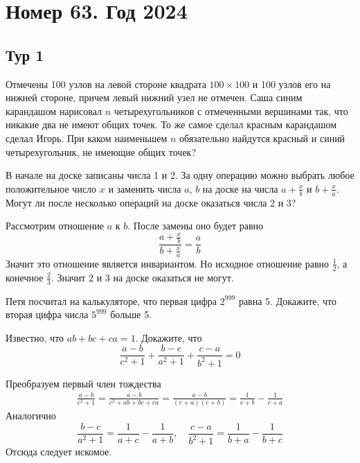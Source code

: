 \documentclass[11pt, a4paper]{problems_template}
\begin{document}
\chapter{Номер 63. Год 2024}

\section{Тур 1}

\begin{exercise}
Отмечены 100 узлов на левой стороне квадрата $100 \times 100$ и 100 узлов его на нижней стороне, причем левый нижний узел не отмечен. Саша синим карандашом нарисовал $n$ четырехугольников с отмеченными вершинами так, что никакие два не имеют общих точек. То же самое сделал красным карандашом сделал Игорь. При каком наименьшем $n$ обязательно найдутся красный и синий четырехугольник, не имеющие общих точек?
\end{exercise}

\begin{exercise}
В начале на доске записаны числа 1 и 2. За одну операцию можно выбрать любое положительное число $x$ и заменить числа $a$, $b$ на доске на числа $a + \frac{x}{b}$ и $b + \frac{x}{a}$. Могут ли
после несколько операций на доске оказаться числа 2 и 3?
\end{exercise}

\begin{Solution}
Рассмотрим отношение $a$ к $b$. После замены оно будет равно
$$
\frac{a + \frac{x}{b}}{b + \frac{x}{a}} = \frac{a}{b}
$$
Значит это отношение является инвариантом. Но исходное отношение равно $\frac{1}{2}$, а конечное $\frac{2}{3}$. Значит 2 и 3 на доске оказаться не могут.
\end{Solution}

\begin{exercise}
Петя посчитал на калькуляторе, что первая цифра $2^{999}$ равна 5. Докажите, что вторая цифра числа $5^{999}$ больше 5.
\end{exercise}

\begin{exercise}
Известно, что $ab + bc + ca = 1$. Докажите, что
$$
\frac{a - b}{c^{2} + 1} + \frac{b - c}{a^{2} + 1} + \frac{c - a}{b^{2} + 1} = 0
$$
\end{exercise}

\begin{Solution}
Преобразуем первый член тождества
\begin{align*}
\frac{a - b}{c^{2} + 1} = \frac{a - b}{c^{2} + ab + bc + ca} = \frac{a - b}{(c + a)(c + b)} = \frac{1}{c + b} - \frac{1}{c + a}
\end{align*}
Аналогично
$$
\frac{b - c}{a^2 + 1} = \frac{1}{a + c} - \frac{1}{a + b}, \quad 
\frac{c - a}{b^2 + 1} = \frac{1}{b + a} - \frac{1}{b + c}
$$
Отсюда следует искомое.
\end{Solution}
\end{document}
